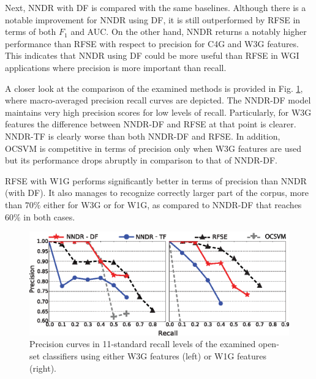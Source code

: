 Next, NNDR with DF is compared with the same baselines. Although there is a notable improvement for NNDR using DF, it is still outperformed by RFSE in terms of both $F_1$ and AUC. On the other hand, NNDR returns a notably higher performance than RFSE with respect to precision for C4G and W3G features. This indicates that NNDR using DF could be more useful than RFSE in WGI applications where precision is more important than recall.

A closer look at  the comparison of the examined methods is provided in Fig. \ref{chap:word_embeddings:fig:NNDR_W3G_Best_RFSE_Baseline}, where macro-averaged precision recall curves are depicted. The NNDR-DF model maintains very high precision scores for low levels of recall. Particularly, for W3G features the difference between NNDR-DF and RFSE at that point is clearer. NNDR-TF is clearly worse than both NNDR-DF and RFSE. In addition, OCSVM is competitive in terms of precision only when W3G features are used but its performance drops abruptly in comparison to that of NNDR-DF. 

RFSE with W1G performs significantly better in terms of precision than NNDR (with DF). It also manages to recognize correctly larger part of the corpus, more than $70\%$ either for W3G or for W1G, as compared to NNDR-DF that reaches $60\%$ in both cases. 

\begin{figure}[t]
\begin{center}
    \includegraphics[scale=0.95]{Figures/NNDR_W3G-W1G_Best_RFSE-OCSVM-Baselines.eps}
	\caption{Precision curves in 11-standard recall levels of the examined open-set classifiers using either W3G features (left) or W1G features (right).}
	\label{chap:word_embeddings:fig:NNDR_W3G_Best_RFSE_Baseline}
	\end{center}
\end{figure}


